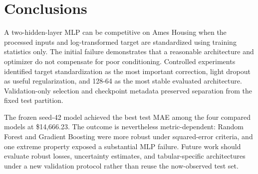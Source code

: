 \documentclass[11pt,a4paper]{article}
\begin{document}
\section{Conclusions}
A two-hidden-layer MLP can be competitive on Ames Housing when the processed inputs and log-transformed target are standardized using training statistics only. The initial failure demonstrates that a reasonable architecture and optimizer do not compensate for poor conditioning. Controlled experiments identified target standardization as the most important correction, light dropout as useful regularization, and 128-64 as the most stable evaluated architecture. Validation-only selection and checkpoint metadata preserved separation from the fixed test partition.

The frozen seed-42 model achieved the best test MAE among the four compared models at \$14,666.23. The outcome is nevertheless metric-dependent: Random Forest and Gradient Boosting were more robust under squared-error criteria, and one extreme property exposed a substantial MLP failure. Future work should evaluate robust losses, uncertainty estimates, and tabular-specific architectures under a new validation protocol rather than reuse the now-observed test set.



\end{document}
